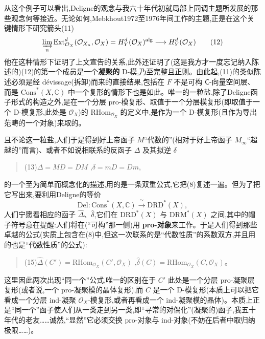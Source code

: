 \noindent 从这个例子可以看出,Deligne的观念与我六十年代初就局部上同调主题所发展的那些观念何等接近。无论如何,Mebkhout1972至1976年间工作的主题,正是在这个关键情形下研究箭头(11)
\begin{equation*}
\varinjlim_{n}\mathrm{Ext}^{d}_{\mathcal{O}_{X}}(\mathcal{O}_{X_{n}},\mathcal{O}_{X})=H^{d}_{Y}(\mathcal{O}_{X})^{\mathrm{alg}}\longrightarrow H^{d}_{Y}(\mathcal{O}_{X})
\tag{12}
\end{equation*}
他在这种情形下证明了上文宣告的关系,此外还证明了(这是我方才一度忘记纳入陈述的)(12)的第一个成员是一个\textbf{凝聚的} D-模,乃至完整且正则。由此起,(11)的类似陈述必须是经 dévissage(拆卸)而来的直接结果,\dmark{}包括在 $F$ 不是可构 $\mathsf{C}$-向量空间层、而是 $\mathrm{Cons}^{*}(X,\mathbb{C})$ 中一个复形的情形下也是如此。唯一的一粒盐,除了Deligne函子形式的构造之外,是在一个分层 pro-模复形、取值于一个分层模复形(即取值于一个 D-模复形,此处是 $\mathcal{O}_{X}$)的 $\mathrm{RHom}_{\mathcal{O}_{X}}$ 的定义中,是作为一个 D-模复形(且作为导出范畴的一个对象)来取的。

\noindent 且不论这一粒盐,人们于是得到好上帝函子 $M$“代数的”(相对于好上帝函子 $M_{\infty}$“超越的”而言)、或者不如说相联系的反函子 $\Delta$ 及其拟逆 $\delta$
\begin{quote}
(13)\quad $\Delta=MD=DM$ ,\quad $\delta=mD=Dm$,
\end{quote}
的一个至为简单而概念化的描述,用的是一条双重公式,它把(8)复述一遍。但为了把它写出来,要利用Deligne的等价
\begin{equation*}
\mathrm{Del} : \mathrm{Cons}^{*}(X,\mathbb{C})\xrightarrow{\ \simeq\ }\mathrm{DRD}^{*}(X),
\tag{14}
\end{equation*}
人们宁愿看相应的函子 $\hat{\Delta}$、$\hat{\delta}$,它们在 $\mathrm{DRD}^{*}(X)$ 与 $\mathrm{DRM}^{*}(X)$ 之间,其中的帽子符号意在提醒:人们将在(“可构”那一侧)用 \textbf{pro-对象}来工作。于是人们得到那些卓越的公式(实质上包含在(8)中,但这一次联系的是“代数性质”的系数双方,并且用的也是“代数性质”的公式):
\begin{quote}
(15)\quad $\hat{\Delta}(C')=\mathrm{RHom}_{\mathcal{O}_{X}}(C',\mathcal{O}_{X})$ ,\quad $\hat{\delta}(C)=\mathrm{RHom}_{\mathcal{O}_{X}}(C,\mathcal{O}_{X})$。
\end{quote}
这里因此两次出现“同一个”公式,唯一的区别在于 $C'$ 此处是一个分层 pro-凝聚层复形(或者说,一个 pro-凝聚模的晶体复形),而 $C$ 是一个 D-模复形(本质上可以把它看成一个分层 ind-凝聚 $\mathcal{O}_{X}$-模复形,或者再看成一个 ind-凝聚模的晶体)。本质上正是“同一个”函子使人们从一类走到另一类,即“寻常的对偶化”(凝聚的)函子,我五十年代的老友……诚然,“显然”它必须交换 pro-对象与 ind-对象(不妨在后者中取归纳极限……)。

